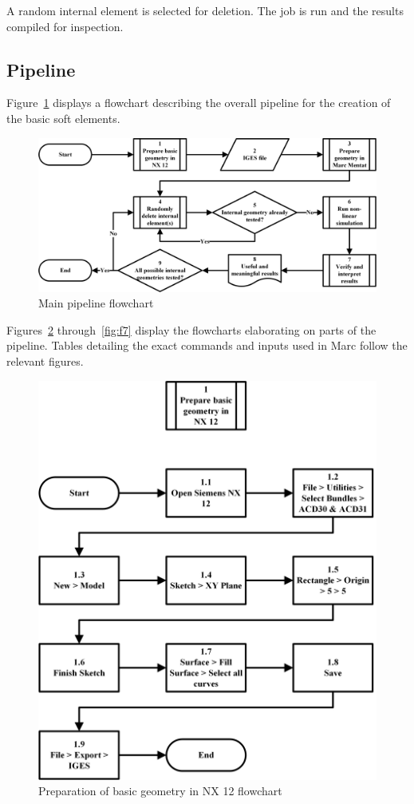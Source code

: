 A random internal element is selected for deletion. The job is run and the results compiled for inspection.

\subsection{Pipeline}

Figure~\ref{fig:fm} displays a flowchart describing the overall pipeline for the creation of the basic soft elements.

\begin{figure}
	\includegraphics[width=1\textwidth]{Q1_Full.png}
	\caption{Main pipeline flowchart}
	\label{fig:fm}
\end{figure}

Figures~\ref{fig:f1} through~\ref{fig:f7} display the flowcharts elaborating on parts of the pipeline. Tables detailing the exact commands and inputs used in Marc follow the relevant figures.

\begin{figure}
	\includegraphics[width=1\textwidth]{Q1_1.png}
	\caption{Preparation of basic geometry in NX 12 flowchart}
	\label{fig:f1}
\end{figure}


